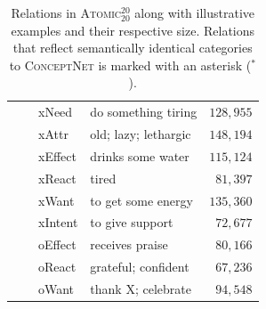 \documentclass[10pt,aspectratio=43]{beamer}
\newcommand\atomicTT{\textsc{Atomic$^{20}_{20}$}\xspace}
\newcommand\conceptnet{\textsc{ConceptNet}\xspace}
\begin{document}
\begin{frame}
\begin{table}[t]
{\begin{tabular}{p{1em}p{4.5em}p{5.5em}p{9.5em}r}
              &  & xNeed & do something tiring & $128{,}955$ \\
            & & xAttr & old; lazy; lethargic  & $148{,}194$\\
            & & xEffect & drinks some water & $115{,}124$\\
            & & xReact & tired & $81{,}397$\\
            & & xWant & to get some energy & $135{,}360$ \\
            &  & xIntent & to give support & $72{,}677$\\
            & & oEffect & receives praise & $80{,}166$\\
            & & oReact & grateful; confident  & $67{,}236$\\
            & & oWant & thank X; celebrate   & $94{,}548$\\
            \bottomrule
            \end{tabular}}
            \caption{Relations in \atomicTT{} along with illustrative examples and their respective size. Relations that reflect semantically identical categories to \conceptnet{} is marked with an asterisk ($^*$).}
            \label{tab:atomic2020-newrelations}
        \end{table}

    \end{frame}
    
\end{document}

